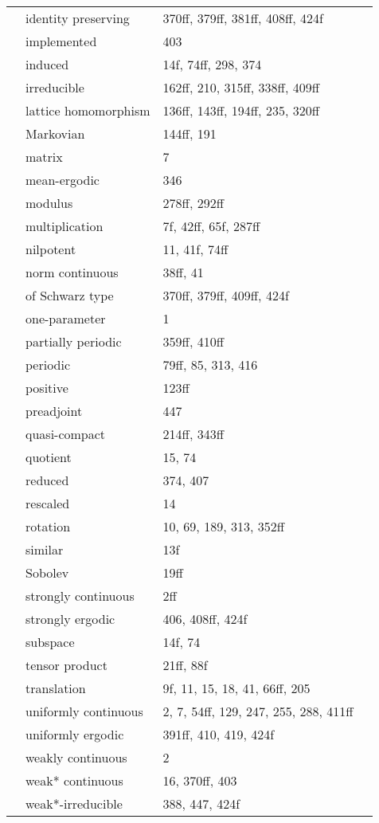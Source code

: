 \documentclass[10pt]{scrartcl}
\begin{document}
\begin{longtable}{>{\bfseries}p{4cm}p{4cm}p{4cm}p{4cm}}
	& identity preserving 	& 370ff, 379ff, 381ff, 408ff, 424f \\
	& implemented 	& 403 \\
	& induced 	& 14f, 74ff, 298, 374 \\
	& irreducible 	& 162ff, 210, 315ff, 338ff, 409ff \\
	& lattice homomorphism 	& 136ff, 143ff, 194ff, 235, 320ff \\
	& Markovian 	& 144ff, 191 \\
	& matrix 	& 7 \\
	& mean-ergodic 	& 346 \\
	& modulus 	& 278ff, 292ff \\
	& multiplication 	& 7f, 42ff, 65f, 287ff \\
	& nilpotent 	& 11, 41f, 74ff \\
	& norm continuous 	& 38ff, 41 \\
	& of Schwarz type 	& 370ff, 379ff, 409ff, 424f \\
	& one-parameter 	& 1 \\
	& partially periodic 	& 359ff, 410ff \\
	& periodic 	& 79ff, 85, 313, 416 \\
	& positive 	& 123ff \\
	& preadjoint 	& 447 \\
	& quasi-compact 	& 214ff, 343ff \\
	& quotient 	& 15, 74 \\
	& reduced 	& 374, 407 \\
	& rescaled 	& 14 \\
	& rotation 	& 10, 69, 189, 313, 352ff \\
	& similar 	& 13f \\
	& Sobolev 	& 19ff \\
	& strongly continuous 	& 2ff \\
	& strongly ergodic 	& 406, 408ff, 424f \\
	& subspace 	& 14f, 74 \\
	& tensor product 	& 21ff, 88f \\
	& translation 	& 9f, 11, 15, 18, 41, 66ff, 205 \\
	& uniformly continuous 	& 2, 7, 54ff, 129, 247, 255, 288, 411ff \\
	& uniformly ergodic 	& 391ff, 410, 419, 424f \\
	& weakly continuous 	& 2 \\
	& weak* continuous 	& 16, 370ff, 403 \\
	& weak*-irreducible 	& 388, 447, 424f \\

\end{longtable}
\end{document}
